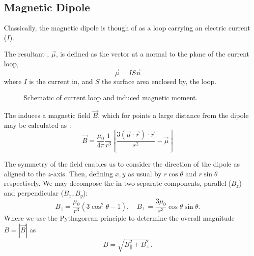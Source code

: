 \subsection{Magnetic Dipole}
Classically, the magnetic dipole is though of as a loop carrying an
electric current ($I$). 

The resultant , $\vec{\mu}$, is defined as the vector at a normal to the  
plane of the current loop, 
\begin{equation}
    \vec{\mu} = IS \vec{n}
    \label{eq:dipole_moment}
\end{equation}
where $I$ is the current in, and $S$ the surface area enclosed by, the loop. 

\begin{wrapfigure}{l}{0.4\textwidth}%
    \centering%
        
  \caption{Schematic of current loop and induced magnetic moment.}%
\end{wrapfigure}%


The  induces a magnetic field $\vec{B}$, which for points a large distance from the dipole may be calculated as \cite{Griffiths2012-pt}:
\begin{equation}
    \vec{B} = \frac{\mu_0}{4\pi} \frac{1}{r^3} \left[\frac{3(\vec{\mu} \cdot \vec{r}) \cdot \vec{r}}{r^2} - \vec{\mu}\right]
    \label{eq:}
\end{equation}

The symmetry of the field enables us to consider the direction of the dipole as aligned to the $z$-axis. Then, defining $x,y$ as usual by $r \cos\theta$ and $r \sin\theta$ respectively. We may decompose the  in two separate components, parallel ($B_z$) and perpendicular ($B_x, B_y$): 
$$B_\parallel =\frac{\mu_0}{r^3}(3\cos^2 \theta - 1), \quad B_\perp = \frac{3\mu_0}{r^3}\cos\theta\sin\theta.$$
Where we use the Pythagorean principle to determine the overall magnitude $B = |\vec{B}|$ as
$$B = \sqrt{B_\parallel^2 + B_\perp^2}.$$
